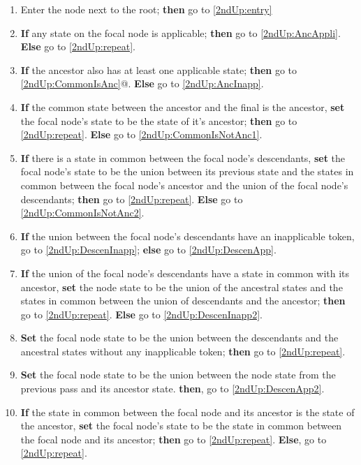 \documentclass[a4paper,12pt]{article}
\begin{document}
\begin{enumerate}
    \item Enter the node next to the root; \textbf{then} go to \ref{2ndUp:entry}
    \item \label{2ndUp:entry} \textbf{If} any state on the focal node is applicable; \textbf{then} go to \ref{2ndUp:AncAppli}. \textbf{Else} go to \ref{2ndUp:repeat}.
    \item \label{2ndUp:AncAppli} \textbf{If} the ancestor also has at least one applicable state; \textbf{then} go to \ref{2ndUp:CommonIsAnc}{@}. \textbf{Else} go to \ref{2ndUp:AncInapp}.
    \item \label{2ndUp:CommonIsAnc} \textbf{If} the common state between the ancestor and the final is the ancestor, \textbf{set} the focal node's state to be the state of it's ancestor; \textbf{then} go to \ref{2ndUp:repeat}. \textbf{Else} go to \ref{2ndUp:CommonIsNotAnc1}.
    \item \label{2ndUp:CommonIsNotAnc1} \textbf{If} there is a state in common between the focal node's descendants, \textbf{set} the focal node's state to be the union between its previous state and the states in common between the focal node's ancestor and the union of the focal node's descendants; \textbf{then} go to \ref{2ndUp:repeat}. \textbf{Else} go to \ref{2ndUp:CommonIsNotAnc2}.
    \item \label{2ndUp:CommonIsNotAnc2} \textbf{If} the union between the focal node's descendants have an inapplicable token, go to \ref{2ndUp:DescenInapp}; \textbf{else} go to \ref{2ndUp:DescenApp}.
    \item \label{2ndUp:DescenInapp} \textbf{If} the union of the focal node's descendants have a state in common with its ancestor, \textbf{set} the node state to be the union of the ancestral states and the states in common between the union of descendants and the ancestor; \textbf{then} go to \ref{2ndUp:repeat}. \textbf{Else} go to \ref{2ndUp:DescenInapp2}.
    \item \label{2ndUp:DescenInapp2} \textbf{Set} the focal node state to be the union between the descendants and the ancestral states without any inapplicable token; \textbf{then} go to \ref{2ndUp:repeat}.
    \item \label{2ndUp:DescenApp} \textbf{Set} the focal node state to be the union between the node state from the previous pass and its ancestor state. \textbf{then}, go to \ref{2ndUp:DescenApp2}.
    \item \label{2ndUp:DescenApp2} \textbf{If} the state in common between the focal node and its ancestor is the state of the ancestor, \textbf{set} the focal node's state to be the state in common between the focal node and its ancestor; \textbf{then} go to \ref{2ndUp:repeat}. \textbf{Else}, go to \ref{2ndUp:repeat}.

\end{enumerate}
\end{document}
